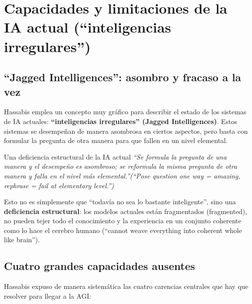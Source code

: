 \section{Capacidades y limitaciones de la IA actual (``inteligencias irregulares'')}

\subsection{``Jagged Intelligences'': asombro y fracaso a la vez}

Hassabis emplea un concepto muy gráfico para describir el estado de los sistemas de IA actuales: \textbf{``inteligencias irregulares'' (Jagged Intelligences)}. Estos sistemas se desempeñan de manera asombrosa en ciertos aspectos, pero basta con formular la pregunta de otra manera para que fallen en un nivel elemental.

\begin{warningbox}{Una deficiencia estructural de la IA actual}
\textit{``Se formula la pregunta de una manera y el desempeño es asombroso; se reformula la misma pregunta de otra manera y falla en el nivel más elemental.''(``Pose question one way = amazing, rephrase = fail at elementary level.'')}

Esto no es simplemente que ``todavía no sea lo bastante inteligente'', sino una \textbf{deficiencia estructural}: los modelos actuales están fragmentados (fragmented), no pueden tejer todo el conocimiento y la experiencia en un conjunto coherente como lo hace el cerebro humano (``cannot weave everything into coherent whole like brain'').
\end{warningbox}

\subsection{Cuatro grandes capacidades ausentes}

Hassabis expuso de manera sistemática las cuatro carencias centrales que hay que resolver para llegar a la AGI:

